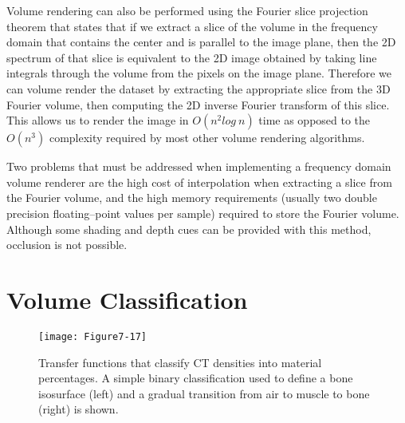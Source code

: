 Volume rendering can also be performed using the Fourier slice projection theorem \cite{Totsuka92} that states that if we extract a slice of the volume in the frequency domain that contains the center and is parallel to the image plane, then the 2D spectrum of that slice is equivalent to the 2D image obtained by taking line integrals through the volume from the pixels on the image plane. Therefore we can volume render the dataset by extracting the appropriate slice from the 3D Fourier volume, then computing the 2D inverse Fourier transform of this slice. This allows us to render the image in $O(n^2log\ n)$ time as opposed to the $O(n^3)$ complexity required by most other volume rendering algorithms.

Two problems that must be addressed when implementing a frequency domain volume renderer are the high cost of interpolation when extracting a slice from the Fourier volume, and the high memory requirements (usually two double precision floating--point values per sample) required to store the Fourier volume. Although some shading and depth cues can be provided with this method, occlusion is not possible.

\section{Volume Classification}

\begin{figure}[!htb]
	\texttt{[image: Figure7-17]}
	\caption{Transfer functions that classify CT densities into material percentages. A simple binary classification used to define a bone isosurface (left) and a gradual transition from air to muscle to bone (right) is shown.}\label{fig:Figure7-17}
\end{figure}

